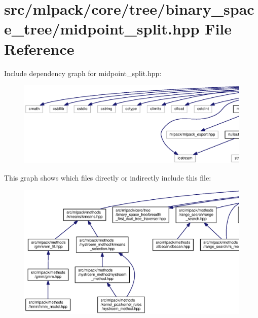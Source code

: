 \section{src/mlpack/core/tree/binary\+\_\+space\+\_\+tree/midpoint\+\_\+split.hpp File Reference}
\label{midpoint__split_8hpp}
Include dependency graph for midpoint\+\_\+split.\+hpp\+:
\nopagebreak
\begin{figure}[H]
\begin{center}
\leavevmode
\includegraphics[width=350pt]{midpoint__split_8hpp__incl}
\end{center}
\end{figure}
This graph shows which files directly or indirectly include this file\+:
\nopagebreak
\begin{figure}[H]
\begin{center}
\leavevmode
\includegraphics[width=350pt]{midpoint__split_8hpp__dep__incl}
\end{center}
\end{figure}
